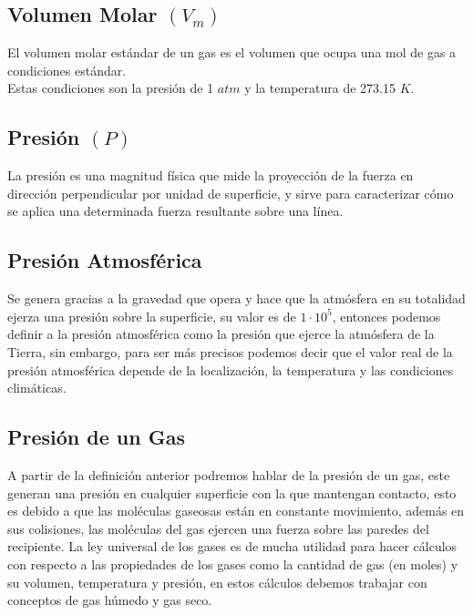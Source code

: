 \documentclass[../main.tex]{subfiles}
\begin{document}
\subsection{Volumen Molar $(V_m)$}
El volumen molar estándar de un gas es el volumen que ocupa una mol de gas a 
condiciones estándar. \\
Estas condiciones son la presión de 1 $atm$
y la temperatura de 273.15 $K$. \cite{lab}

\subsection{Presión $(P)$}
La presión es una magnitud física que mide la proyección de la fuerza en
dirección perpendicular por unidad de superficie, y sirve para caracterizar 
cómo se aplica una determinada fuerza resultante sobre una
línea. \cite{pression}

\subsection{Presión Atmosférica}
Se genera gracias a la gravedad que opera y hace que la atmósfera en su totalidad 
ejerza una presión sobre la superficie, su valor es de $1 \cdot 10^5$, entonces podemos 
definir a la presión atmosférica como la presión que ejerce la atmósfera de la Tierra, 
sin embargo, para ser más precisos podemos decir que el valor real de la presión 
atmosférica depende de la localización, la temperatura y las condiciones climáticas.

\subsection{Presión de un Gas}
A partir de la definición anterior podremos hablar de la presión de un gas, 
este generan una presión en cualquier superficie con la que mantengan 
contacto, esto es debido a que las moléculas gaseosas están en constante 
movimiento, además en sus colisiones, las moléculas del gas ejercen una fuerza 
sobre las paredes del recipiente.
La ley universal de los gases es de mucha utilidad para hacer cálculos con respecto 
a las propiedades de los gases como la cantidad de gas (en moles) y su volumen, 
temperatura y presión, en estos cálculos debemos trabajar con conceptos de gas 
húmedo y gas seco.\cite{chang}
\end{document}
